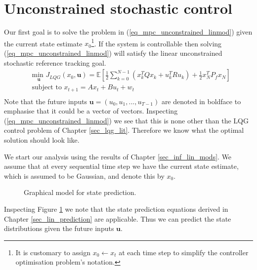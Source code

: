 \section{Unconstrained stochastic control}
\label{sec_uncon_lin_control}
Our first goal is to solve the problem in (\ref{eq_mpc_unconstrained_linmod}) given the current state estimate $x_0$\footnote{It is customary to assign $x_0 \leftarrow x_t$ at each time step to simplify the controller optimisation problem's notation.}. If the system is controllable then solving (\ref{eq_mpc_unconstrained_linmod}) will satisfy the linear unconstrained stochastic reference tracking goal.
\begin{equation}
\begin{aligned}
&\underset{\mathbf{u}}{\text{min }} J_{LQG}(x_0, \mathbf{u}) = \mathbb{E}\left[ \frac{1}{2}\sum_{k=0}^{N-1} \left( x_k^TQx_k + u_k^TRu_k \right) + \frac{1}{2}x_N^TP_fx_N \right] \\
& \text{subject to } x_{t+1}=Ax_t+Bu_t + w_t\\
\end{aligned}
\label{eq_mpc_unconstrained_linmod}
\end{equation}
Note that the future inputs $\mathbf{u}=(u_0, u_1,...,u_{T-1})$ are denoted in boldface to emphasise that it could be a vector of vectors. Inspecting (\ref{eq_mpc_unconstrained_linmod}) we see that this is none other than the LQG control problem of Chapter \ref{sec_lqg_lit}. Therefore we know what the optimal solution should look like.

We start our analysis using the results of Chapter \ref{sec_inf_lin_mods}. We assume that at every sequential time step we have the current state estimate, which is assumed to be Gaussian, and denote this by $x_0$. 
\begin{figure}[H] 
\centering
{}
\caption{Graphical model for state prediction.}
\label{fig_gm_mpc}
\end{figure}
Inspecting Figure \ref{fig_gm_mpc} we note that the state prediction equations derived in Chapter \ref{sec_lin_prediction} are applicable. Thus we can predict the state distributions given the future inputs $\mathbf{u}$.


